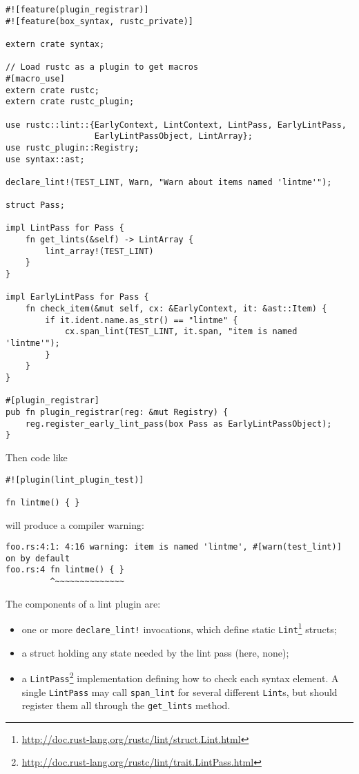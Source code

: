 \documentclass[a4paper,]{book}
\renewcommand{\href}[2]{#2\footnote{\url{#1}}}
\begin{document}
\begin{verbatim}
#![feature(plugin_registrar)]
#![feature(box_syntax, rustc_private)]

extern crate syntax;

// Load rustc as a plugin to get macros
#[macro_use]
extern crate rustc;
extern crate rustc_plugin;

use rustc::lint::{EarlyContext, LintContext, LintPass, EarlyLintPass,
                  EarlyLintPassObject, LintArray};
use rustc_plugin::Registry;
use syntax::ast;

declare_lint!(TEST_LINT, Warn, "Warn about items named 'lintme'");

struct Pass;

impl LintPass for Pass {
    fn get_lints(&self) -> LintArray {
        lint_array!(TEST_LINT)
    }
}

impl EarlyLintPass for Pass {
    fn check_item(&mut self, cx: &EarlyContext, it: &ast::Item) {
        if it.ident.name.as_str() == "lintme" {
            cx.span_lint(TEST_LINT, it.span, "item is named 'lintme'");
        }
    }
}

#[plugin_registrar]
pub fn plugin_registrar(reg: &mut Registry) {
    reg.register_early_lint_pass(box Pass as EarlyLintPassObject);
}
\end{verbatim}

Then code like

\begin{verbatim}
#![plugin(lint_plugin_test)]

fn lintme() { }
\end{verbatim}

will produce a compiler warning:

\begin{verbatim}
foo.rs:4:1: 4:16 warning: item is named 'lintme', #[warn(test_lint)] on by default
foo.rs:4 fn lintme() { }
         ^~~~~~~~~~~~~~~
\end{verbatim}

The components of a lint plugin are:

\begin{itemize}
\item
  one or more \texttt{declare\_lint!} invocations, which define static
  \href{http://doc.rust-lang.org/rustc/lint/struct.Lint.html}{\texttt{Lint}}
  structs;
\item
  a struct holding any state needed by the lint pass (here, none);
\item
  a
  \href{http://doc.rust-lang.org/rustc/lint/trait.LintPass.html}{\texttt{LintPass}}
  implementation defining how to check each syntax element. A single
  \texttt{LintPass} may call \texttt{span\_lint} for several different
  \texttt{Lint}s, but should register them all through the
  \texttt{get\_lints} method.
\end{itemize}
\end{document}
